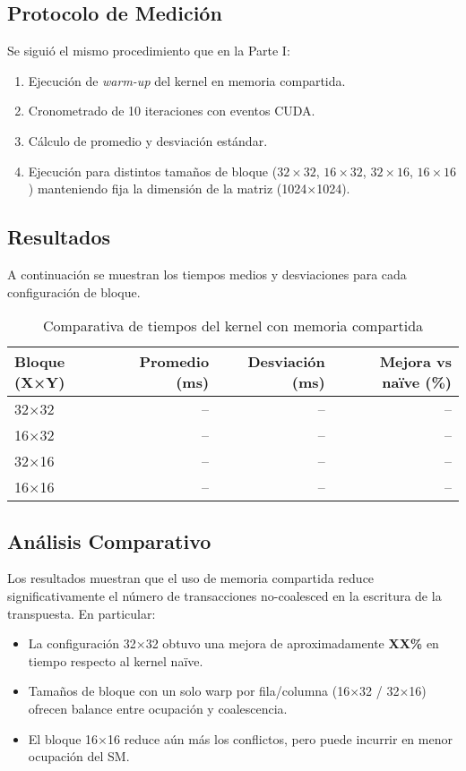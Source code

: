 \documentclass[a4paper,11pt]{article}
\begin{document}
\subsection{Protocolo de Medición}
Se siguió el mismo procedimiento que en la Parte I:
\begin{enumerate}[noitemsep]
  \item Ejecución de \textit{warm-up} del kernel en memoria compartida.
  \item Cronometrado de 10 iteraciones con eventos CUDA.
  \item Cálculo de promedio y desviación estándar.
  \item Ejecución para distintos tamaños de bloque ($32\times32$, $16\times32$, $32\times16$, $16\times16$) manteniendo fija la dimensión de la matriz (1024×1024).
\end{enumerate}

\subsection{Resultados}
A continuación se muestran los tiempos medios y desviaciones para cada configuración de bloque.
\begin{table}[H]
\centering
\caption{Comparativa de tiempos del kernel con memoria compartida}
\begin{tabular}{lrrr}
\toprule
Bloque (X×Y) & Promedio (ms) & Desviación (ms) & Mejora vs naïve (\%)\\
\midrule
32×32 & -- & -- & -- \\
16×32 & -- & -- & -- \\
32×16 & -- & -- & -- \\
16×16 & -- & -- & -- \\
\bottomrule
\end{tabular}
\end{table}

\subsection{Análisis Comparativo}
Los resultados muestran que el uso de memoria compartida reduce significativamente el número de transacciones no-coalesced en la escritura de la transpuesta. En particular:
\begin{itemize}[noitemsep]
  \item La configuración 32×32 obtuvo una mejora de aproximadamente \textbf{XX\%} en tiempo respecto al kernel naïve.
  \item Tamaños de bloque con un solo warp por fila/columna (16×32 / 32×16) ofrecen balance entre ocupación y coalescencia.
  \item El bloque 16×16 reduce aún más los conflictos, pero puede incurrir en menor ocupación del SM.
\end{itemize}
\end{document}
